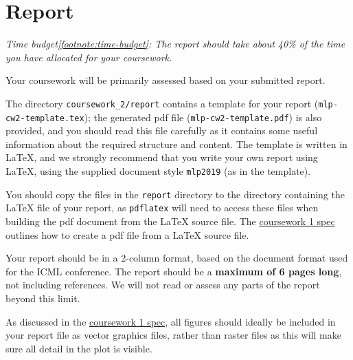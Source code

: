 \documentclass[11pt,]{article}
\def\pagelimit{6\xspace}
\begin{document}
\section{Report}
\label{sec:report}

\textit{Time budget\cref{footnote:time-budget}: The report should take about 40\% of the time you have allocated for your coursework.}\newline


Your coursework will be primarily assessed based on your submitted report.

The directory \verb+coursework_2/report+ contains a template for your report (\verb+mlp-cw2-template.tex+);  the generated pdf file (\verb+mlp-cw2-template.pdf+) is also provided, and you should read this file carefully as it contains some useful information about the required structure and content. The template is written in LaTeX, and we strongly recommend that you write your own report using LaTeX, using the supplied document style \verb+mlp2019+ (as in the template).

You should copy the files in the \verb+report+ directory to the directory containing the LaTeX file of your report, as \verb+pdflatex+ will need to access these files when building the pdf document from the LaTeX source file. The  \href{http://www.inf.ed.ac.uk/teaching/courses/mlp/2019-20/cw/mlp_cw1_2019_20.pdf}{coursework 1 spec} outlines how to create a pdf file from a LaTeX source file.

Your report should be in a 2-column format, based on the document format used for the ICML conference. The report should be a \textbf{maximum of \pagelimit pages long}, not including references.  We will not read or assess any parts of the report beyond this limit.

As discussed in the \href{http://www.inf.ed.ac.uk/teaching/courses/mlp/2019-20/cw/mlp_cw1_2019_20.pdf}{coursework 1 spec},  all figures should ideally be included in your report file as vector graphics files, rather than raster files as this will make sure all detail in the plot is visible.

\end{document}
